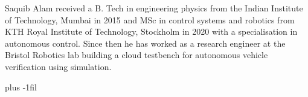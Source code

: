 \documentclass[letterpaper, 10 pt, journal, twoside]{IEEEtran}
\begin{document}
\begin{IEEEbiography}{Saquib Alam}
received a B. Tech  in engineering physics from the Indian Institute of Technology, Mumbai in 2015 and MSc in control systems and robotics from KTH Royal Institute of Technology, Stockholm in 2020 with a specialisation in autonomous control. Since then he has worked as a research engineer at the Bristol Robotics lab building a cloud testbench for autonomous vehicle verification using simulation. 
 \end{IEEEbiography}

\baselineskip plus -1fil  
\end{document}
